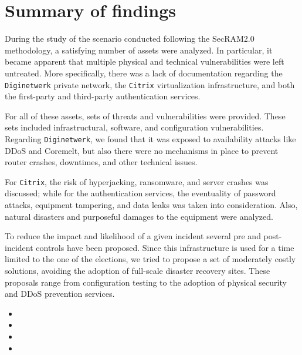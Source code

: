 \chapter*{Summary of findings}

During the study of the scenario conducted following the SecRAM2.0 methodology\cite{article:SecRAM}, a satisfying number of assets were analyzed. In particular, it became apparent that multiple physical and technical vulnerabilities were left untreated.
More specifically, there was a lack of documentation regarding the \texttt{Diginetwerk} private network, the \texttt{Citrix} virtualization infrastructure, and both the first-party and third-party authentication services. 

For all of these assets, sets of threats and vulnerabilities were provided. These sets included infrastructural, software, and configuration vulnerabilities.
Regarding \texttt{Diginetwerk}, we found that it was exposed to availability attacks like DDoS and Coremelt, but also there were no mechanisms in place to prevent router crashes, downtimes, and other technical issues.

For \texttt{Citrix}, the risk of hyperjacking, ransomware, and server crashes was discussed; while for the authentication services, the eventuality of password attacks, equipment tampering, and data leaks was taken into consideration.
Also, natural disasters and purposeful damages to the equipment were analyzed.

To reduce the impact and likelihood of a given incident several pre and post-incident controls have been proposed. Since this infrastructure is used for a time limited to the one of the elections, we tried to propose a set of moderately costly solutions, avoiding the adoption of full-scale disaster recovery sites. These proposals range from configuration testing to the adoption of physical security and DDoS prevention services.\\

\noindent {}

\begin{itemize}
    \item {}
    \item {}
    \item {}
    \item {}
\end{itemize}


